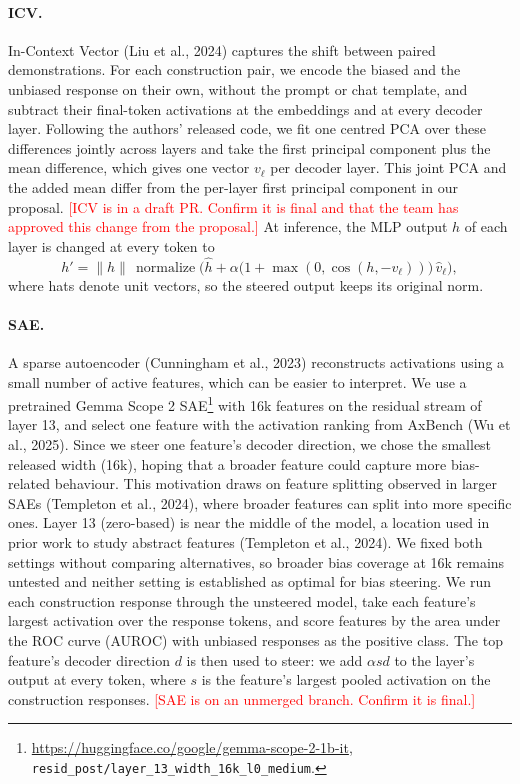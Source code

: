 \documentclass{article}
\newcommand{\pending}[1]{\textcolor{red}{[#1]}} %
\begin{document}
\paragraph{ICV.} In-Context Vector (Liu et al., 2024) captures the shift between paired demonstrations. For each construction pair, we encode the biased and the unbiased response on their own, without the prompt or chat template, and subtract their final-token activations at the embeddings and at every decoder layer. Following the authors' released code, we fit one centred PCA over these differences jointly across layers and take the first principal component plus the mean difference, which gives one vector $v_\ell$ per decoder layer. This joint PCA and the added mean differ from the per-layer first principal component in our proposal. \pending{ICV is in a draft PR. Confirm it is final and that the team has approved this change from the proposal.} At inference, the MLP output $h$ of each layer is changed at every token to
\begin{equation}
h' = \lVert h \rVert \,\operatorname{normalize}\!\Big(\hat{h} + \alpha\big(1 + \max(0, \cos(h, -v_\ell))\big)\,\hat{v}_\ell\Big),
\end{equation}
where hats denote unit vectors, so the steered output keeps its original norm.

\paragraph{SAE.} A sparse autoencoder (Cunningham et al., 2023) reconstructs activations using a small number of active features, which can be easier to interpret. We use a pretrained Gemma Scope 2 SAE\footnote{\url{https://huggingface.co/google/gemma-scope-2-1b-it}, \texttt{resid\_post/layer\_13\_width\_16k\_l0\_medium}.} with 16k features on the residual stream of layer 13, and select one feature with the activation ranking from AxBench (Wu et al., 2025). Since we steer one feature's decoder direction, we chose the smallest released width (16k), hoping that a broader feature could capture more bias-related behaviour. This motivation draws on feature splitting observed in larger SAEs (Templeton et al., 2024), where broader features can split into more specific ones. Layer 13 (zero-based) is near the middle of the model, a location used in prior work to study abstract features (Templeton et al., 2024). We fixed both settings without comparing alternatives, so broader bias coverage at 16k remains untested and neither setting is established as optimal for bias steering. We run each construction response through the unsteered model, take each feature's largest activation over the response tokens, and score features by the area under the ROC curve (AUROC) with unbiased responses as the positive class. The top feature's decoder direction $d$ is then used to steer: we add $\alpha s d$ to the layer's output at every token, where $s$ is the feature's largest pooled activation on the construction responses. \pending{SAE is on an unmerged branch. Confirm it is final.}
\end{document}
